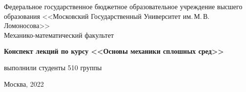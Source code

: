 \documentclass[specialist, subf, href, 12pt, final]{disser}
\theoremstyle{definition}
\begin{document}
\begin{titlepage}
  \begin{center}

    Федеральное государственное бюджетное образовательное учреждение высшего образования
    <<Московский Государственный Университет им.\,М.\,В.\,Ломоносова>>\\

    \vspace{9cm}
    Механико-математический факультет

    {\bf Конспект лекций по курсу <<Основы механики сплошных сред>>}

    \vspace{9cm}
    \begin{flushright}
      { выполнили студенты 510 группы}\\
    \end{flushright}
    \vspace{1cm}

    \normalsize Москва, 2022
  \end{center}
\end{titlepage}


\tableofcontents























\newpage
\begin{thebibliography}{100}

\end{thebibliography}
\end{document}
